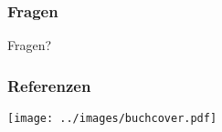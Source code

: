 
\begin{frame}
	\titlepage
\end{frame}







\begin{frame}
\frametitle{Fragen}
\begin{center}
    \Huge Fragen?
\end{center}
\end{frame}

\begin{frame}
\frametitle{Referenzen}
\begin{center}
	\texttt{[image: ../images/buchcover.pdf]}
\end{center}
\end{frame}